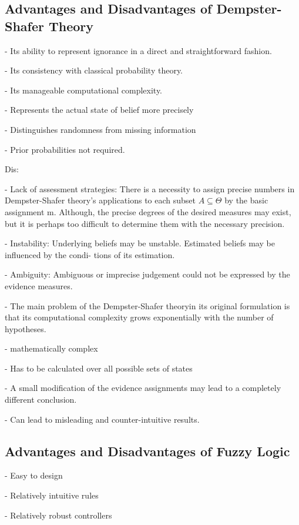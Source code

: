 \documentclass[11pt]{article}
\begin{document}
\subsection{Advantages and Disadvantages of Dempster-Shafer Theory}

- Its ability to represent ignorance in a direct and straightforward fashion.

- Its consistency with classical probability theory.

- Its manageable computational complexity.

- Represents the actual state of belief more precisely

- Distinguishes randomness from missing information

- Prior probabilities not required.

Dis:

- Lack of assessment strategies: There is a necessity to assign precise numbers
in Dempster-Shafer theory's applications to each subset $A \subseteq \Theta$ by
the basic assignment m. Although, the precise degrees of the desired measures
may exist, but it is perhaps too difficult to determine them with the necessary
precision.

- Instability: Underlying beliefs may be unstable. Estimated beliefs may be
influenced by the condi- tions of its estimation.

- Ambiguity: Ambiguous or imprecise judgement could not be expressed by the
evidence measures.

- The main problem of the Dempster-Shafer theoryin its original formulation is
that its computational complexity grows exponentially with the number of
hypotheses.

- mathematically complex

- Has to be calculated over all possible sets of states

- A small modification of the evidence assignments may lead to a completely
different conclusion.

- Can lead to misleading and counter-intuitive results.

\subsection{Advantages and Disadvantages of Fuzzy Logic}

- Easy to design 

- Relatively intuitive rules 

- Relatively robust controllers 
\end{document}
